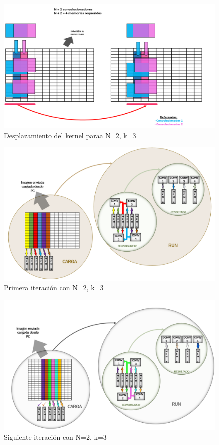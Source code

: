 \documentclass[a4paper]{article}
\begin{document}
\begin{figure}[H]
\centering
\includegraphics[scale=0.75]{conv2_despl}
\caption{Desplazamiento del kernel paraa N=2, k=3 }
\label{writingprocess2}
\end{figure}

\begin{figure}[H]
\centering
\includegraphics[scale=0.7]{example_1}
\caption{Primera iteración con N=2, k=3 }
\label{writingprocess3}
\end{figure}


\begin{figure}[H]
\centering
\includegraphics[scale=0.7]{example_2}
\caption{Siguiente iteración con N=2, k=3}
\label{writingprocess4}
\end{figure}
\end{document}
